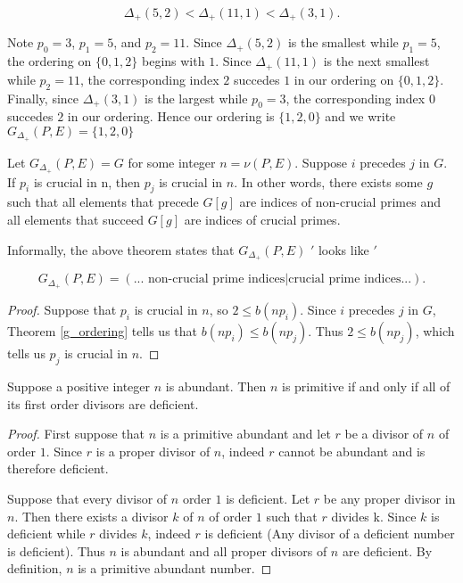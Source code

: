 \documentclass[../paper.tex]{subfiles}
\begin{document}
$$\Delta_{+}(5,2) < \Delta_{+}(11,1) < \Delta_{+}(3,1).$$

Note $p_0 = 3$, $p_1 = 5$, and $p_2 = 11$. Since $\Delta_+(5,2)$
is the smallest while $p_1 = 5$, the ordering on $\{0, 1, 2\}$
begins with $1$. Since $\Delta_+(11,1)$ is the next smallest while
$p_2 = 11$, the corresponding index $2$ succedes $1$ in our
ordering on $\{0,1,2\}$. Finally, since $\Delta_+(3,1)$ is the largest
while $p_0 = 3$, the corresponding index $0$ succedes $2$ in our
ordering. Hence our ordering is $\{1, 2, 0\}$ and we write 
$G_{\Delta_+}(P,E) = \{1, 2, 0\}$ 

\begin{theorem}\label{crucial_thm}
Let $G_{\Delta_+}(P,E) = G$ for some integer $n = \nu (P,E)$.
Suppose $i$ precedes $j$ in $G$. If $p_i$ is crucial in n,
then $p_j$ is crucial in $n$. In other words, there exists some $g$
such that all elements that precede $G[g]$ are indices of non-crucial 
primes and all elements that succeed $G[g]$ are indices of crucial primes.
\end{theorem}

Informally, the above theorem states that $G_{\Delta_+}(P,E)$ 
$'$ looks like $'$

$$ G_{\Delta_+}(P, E) = (\text{... non-crucial prime indices} 
                        | \text{crucial prime indices...}) . $$
\begin{proof}

Suppose that
$p_i$ is crucial in $n$, so $2 \leq b(n p_i)$. Since $i$ precedes 
$j$ in $G$, Theorem {\ref{g_ordering}} tells us that $b(n p_i) \leq b(n
p_j)$. Thus $2 \leq b(n p_j)$, which tells us $p_j$ is crucial in $n$.

\end{proof}


\begin{theorem}\label{del_minus_thm}
Suppose a positive integer $n$ is abundant. Then $n$ is primitive if and 
only if all of its first order divisors are deficient.
\end{theorem}

\begin{proof}
	First suppose that $n$ is a primitive abundant and let $r$ be a
divisor of $n$ of order $1$. Since $r$ is a proper divisor of $n$,
indeed $r$ cannot be abundant and is therefore deficient.

	Suppose that every divisor of $n$ order $1$ is deficient. Let 
$r$ be any proper divisor in $n$. Then there exists a divisor $k$ 
of $n$ of order $1$ such that $r$ divides k. Since $k$ is 
deficient while $r$ divides $k$, indeed $r$ is deficient (Any divisor of a 
deficient number is deficient). Thus $n$
is abundant and all proper divisors of $n$ are deficient. By 
definition, $n$ is a primitive abundant number. 
\end{proof}
\end{document}

